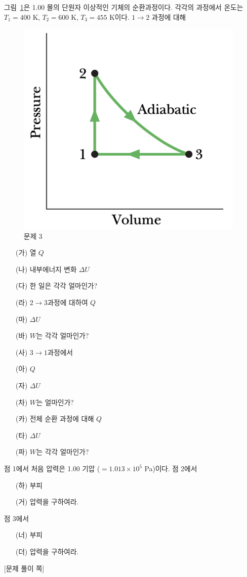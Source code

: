 \documentclass[floatfix,nofootinbib,superscriptaddress,fleqn,preprint]{revtex4-2}
\begin{document}
그림~\ref{fig:1}은 1.00 몰의 단원자
이상적인 기체의 순환과정이다.  각각의 과정에서 온도는 $T_1=400$ K,
$T_2=600$ K, $T_3=455$ K이다.  $1\to 2$ 과정에 대해
\begin{figure}[ht]
  \centering
  \includegraphics[scale=0.6]{Qfig23-1.pdf}
  \caption{문제 3}
  \label{fig:1}
\end{figure}
\begin{itemize}
\item[(가)] 열 $Q$
\item[(나)] 내부에너지 변화 $\Delta U$
\item[(다)] 한 일은 각각 얼마인가? 
\item[(라)] $2\to 3$과정에 대하여 $Q$
\item[(마)] $\Delta U$
\item[(바)] $W$는 각각 얼마인가? 
\item[(사)] $3\to 1$과정에서 
\item[(아)] $Q$
\item[(자)] $\Delta U$
\item[(차)] $W$는 얼마인가?
\item[(카)] 전체 순환 과정에 대해 $Q$
\item[(타)] $\Delta U$
\item[(파)] $W$는 각각 얼마인가?
\end{itemize}
점 1에서 처음 압력은 1.00 기압 ($=1.013\times 10^5$ Pa)이다. 점 2에서
\begin{itemize}
\item[(하)] 부피 
\item[(거)] 압력을 구하여라. 
\end{itemize}
점 3에서 
\begin{itemize}
\item[(너)] 부피 
\item[(더)] 압력을 구하여라. 
\end{itemize}
\newpage
{\color{gray} [문제 풀이 쪽]}

\newpage
\end{document}
